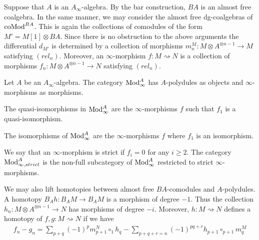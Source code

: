 \documentclass[../thesis.tex]{subfiles}
\begin{document}
            Suppose that $A$ is an $A_\infty$-algebra. By the bar construction, $BA$ is an almost free coalgebra. In the same manner, we may consider the almost free dg-coalgebras of $\tt{coMod}^{BA}$. This is again the collections of comodules of the form $M' = M[1] \otimes BA$. Since there is no obstruction to the above arguments the differential $d_{M'}$ is determined by a collection of morphisms $m^M_n : M \otimes A^{\otimes n-1} \rightarrow M$ satisfying $(rel_n)$. Moreover, an $\infty$-morphism $f: M \rightsquigarrow N$ is a collection of morphisms $f_n : M \otimes A^{\otimes n-1} \rightarrow N$ satisfying $(rel_n)$.

            \begin{definition}
                Let $A$ be an $A_\infty$-algebra. The category $\tt{Mod}_\infty^A$ has $A$-polydules as objects and $\infty$-morphisms as morphisms.

                The quasi-isomorphisms in $\tt{Mod}_\infty^A$ are the $\infty$-morphisms $f$ such that $f_1$ is a quasi-isomorphism.
            \end{definition}

            \begin{remark}
                The isomorphisms of $\tt{Mod}_\infty^A$ are the $\infty$-morphisms $f$ where $f_1$ is an isomorphism.
            \end{remark}

            We say that an $\infty$-morphism is strict if $f_i = 0$ for any $i\geq 2$. The category $\tt{Mod}_{\infty, strict}^A$ is the non-full subcategory of $\tt{Mod}_\infty^A$ restricted to strict $\infty$-morphisms.

            We may also lift homotopies between almost free $BA$-comodules and $A$-polydules. A homotopy $B_Ah : B_AM \rightarrow B_AM$ is a morphism of degree $-1$. Thus the collection $h_n : M \otimes A^{\otimes n-1} \rightarrow N$ has morphisms of degree $-i$. Moreover, $h : M \rightsquigarrow N$ defines a homotopy of $f, g : M \rightsquigarrow N$ if we have
            \begin{align*}
                f_n - g_n = \sum_{p+q}(-1)^{p}m^N_{p+1}\circ_1 h_q - \sum_{p+q+r = n}(-1)^{pq+r}h_{p+1}\circ_{p+1} m^M_q
            \end{align*}
\end{document}
